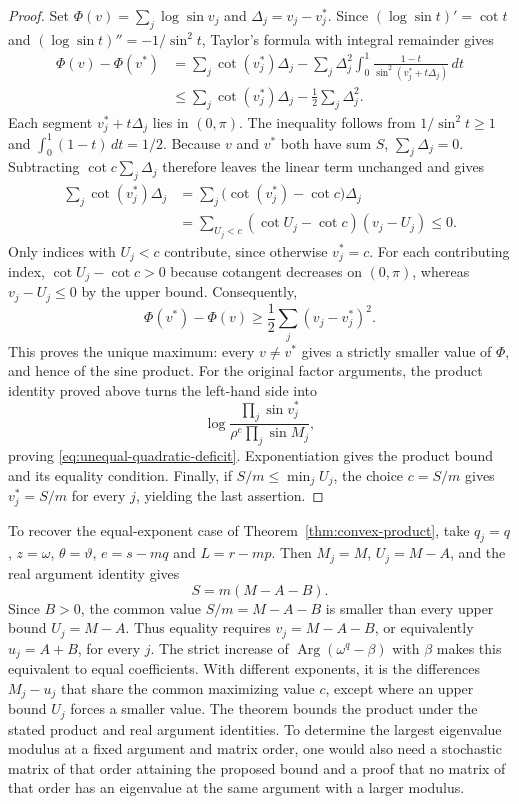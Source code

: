 \documentclass[11pt,a4paper]{article}
\theoremstyle{definition}
\theoremstyle{remark}
\numberwithin{equation}{section}
\begin{document}
\begin{proof}
Set $\Phi(v)=\sum_j\log\sin v_j$ and $\Delta_j=v_j-v_j^*$. Since $(\log\sin t)'=\cot t$ and $(\log\sin t)''=-1/\sin^2t$, Taylor's formula with integral remainder gives
\[
 \begin{aligned}
 \Phi(v)-\Phi(v^*)
 &=\sum_j\cot(v_j^*)\Delta_j
 -\sum_j\Delta_j^2\int_0^1
 \frac{1-t}{\sin^2(v_j^*+t\Delta_j)}\,dt\\
 &\le\sum_j\cot(v_j^*)\Delta_j
 -\frac12\sum_j\Delta_j^2.
 \end{aligned}
\]
Each segment $v_j^*+t\Delta_j$ lies in $(0,\pi)$. The inequality follows from $1/\sin^2t\ge1$ and $\int_0^1(1-t)\,dt=1/2$.
Because $v$ and $v^*$ both have sum $S$, $\sum_j\Delta_j=0$. Subtracting $\cot c\sum_j\Delta_j$ therefore leaves the linear term unchanged and gives
\[
 \begin{aligned}
 \sum_j\cot(v_j^*)\Delta_j
 &=\sum_j\bigl(\cot(v_j^*)-\cot c\bigr)\Delta_j\\
 &=\sum_{U_j<c}(\cot U_j-\cot c)(v_j-U_j)\le0.
 \end{aligned}
\]
Only indices with $U_j<c$ contribute, since otherwise $v_j^*=c$. For each contributing index, $\cot U_j-\cot c>0$ because cotangent decreases on $(0,\pi)$, whereas $v_j-U_j\le0$ by the upper bound. Consequently,
\[
 \Phi(v^*)-\Phi(v)\ge\frac12\sum_j(v_j-v_j^*)^2.
\]
This proves the unique maximum: every $v\ne v^*$ gives a strictly smaller value of $\Phi$, and hence of the sine product. For the original factor arguments, the product identity proved above turns the left-hand side into
\[
 \log\frac{\prod_j\sin v_j^*}{\rho^e\prod_j\sin M_j},
\]
proving \eqref{eq:unequal-quadratic-deficit}. Exponentiation gives the product bound and its equality condition. Finally, if $S/m\le\min_jU_j$, the choice $c=S/m$ gives $v_j^*=S/m$ for every $j$, yielding the last assertion.
\end{proof}

To recover the equal-exponent case of Theorem~\ref{thm:convex-product}, take $q_j=q$, $z=\omega$, $\theta=\vartheta$, $e=s-mq$ and $L=r-mp$. Then $M_j=M$, $U_j=M-A$, and the real argument identity gives
\[
 S=m(M-A-B).
\]
Since $B>0$, the common value $S/m=M-A-B$ is smaller than every upper bound $U_j=M-A$. Thus equality requires $v_j=M-A-B$, or equivalently $u_j=A+B$, for every $j$. The strict increase of $\operatorname{Arg}(\omega^q-\beta)$ with $\beta$ makes this equivalent to equal coefficients. With different exponents, it is the differences $M_j-u_j$ that share the common maximizing value $c$, except where an upper bound $U_j$ forces a smaller value. The theorem bounds the product under the stated product and real argument identities. To determine the largest eigenvalue modulus at a fixed argument and matrix order, one would also need a stochastic matrix of that order attaining the proposed bound and a proof that no matrix of that order has an eigenvalue at the same argument with a larger modulus.
\end{document}
